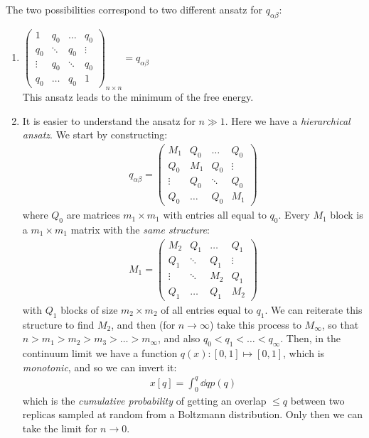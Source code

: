 \documentclass[../template.tex]{subfiles}
\begin{document}
The two possibilities correspond to two different ansatz for $q_{\alpha \beta}$:
\begin{enumerate}
    \item $\displaystyle \left(\begin{array}{cccc}
    1 & q_0 & \dots & q_0 \\ 
    q_0 & \ddots & q_0 & \vdots \\ 
    \vdots & q_0 & \ddots & q_0 \\ 
    q_0 & \dots & q_0 & 1
    \end{array}\right)_{n \times n} = q_{\alpha \beta}$\\
    This ansatz leads to the minimum of the free energy. 
    \item It is easier to understand the ansatz for $n \gg 1$. Here we have a \textit{hierarchical ansatz}. We start by constructing:
    \begin{align*}
        q_{\alpha \beta} = \left(\begin{array}{cccc}
        M_1 & Q_0 & \dots & Q_0 \\ 
        Q_0 & M_1 & Q_0 & \vdots \\ 
        \vdots & Q_0 & \ddots & Q_0 \\ 
        Q_0 & \dots & Q_0 & M_1
        \end{array}\right)
    \end{align*}  
    where $Q_0$ are matrices $m_1 \times m_1$ with entries all equal to $q_0$. Every $M_1$ block is a $m_1 \times m_1$ matrix with the \textit{same structure}:
    \begin{align*}
        M_1 = \left(\begin{array}{cccc}
        M_2 & Q_1 & \dots & Q_1 \\ 
        Q_1 & \ddots & Q_1 & \vdots \\ 
        \vdots & \ddots & M_2 & Q_1 \\ 
        Q_1 & \dots & Q_1 & M_2
        \end{array}\right)
    \end{align*}   
    with $Q_1$ blocks of size $m_2 \times m_2$ of all entries equal to $q_1$. We can reiterate this structure to find $M_2$, and then (for $n \to \infty$)  take this process to $M_{\infty}$, so that $n > m_1 > m_2 > m_3 > \dots > m_\infty$, and also $q_0 < q_1 < \dots < q_\infty$. Then, in the continuum limit we have a function $q(x) \colon [0,1] \mapsto [0,1]$, which is \textit{monotonic}, and so we can invert it:
    \begin{align*}
        x[q] = \int_0^q \dd{q} p(q)
    \end{align*}           
    which is the \textit{cumulative probability} of getting an overlap $\leq q$ between two replicas sampled at random from a Boltzmann distribution. Only then we can take the limit for $n \to 0$.   
\end{enumerate}
\end{document}
